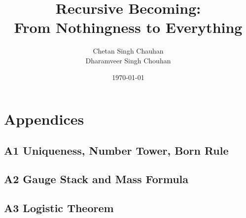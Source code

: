 \documentclass[11pt]{article}
\title{Recursive Becoming:\\From Nothingness to Everything}
\author{Chetan Singh Chauhan \\ Dharamveer Singh Chouhan}
\date{\today}
\begin{document}
\maketitle


\tableofcontents
\clearpage

\FloatBarrier

\FloatBarrier

\FloatBarrier

\FloatBarrier

\FloatBarrier

\FloatBarrier

\FloatBarrier

\FloatBarrier

\FloatBarrier

\FloatBarrier

\FloatBarrier

\FloatBarrier

\FloatBarrier

\FloatBarrier

\FloatBarrier

\FloatBarrier


\appendix
\section*{Appendices}

\subsection*{A1 \quad Uniqueness, Number Tower, Born Rule}




\subsection*{A2 \quad Gauge Stack and Mass Formula}



\subsection*{A3 \quad Logistic Theorem}


\printbibliography
\end{document}
